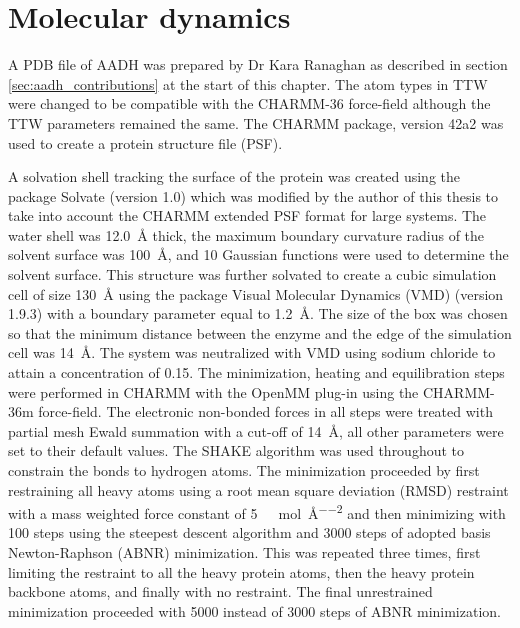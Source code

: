 \section{Molecular dynamics}\label{sec:aadh_md}

A PDB file of AADH was prepared by Dr Kara Ranaghan as described in section \ref{sec:aadh_contributions} at the start of this chapter. The atom types in TTW were changed to be compatible with the CHARMM-36 \cite{huangCHARMM36AllatomAdditive2013} force-field although the TTW parameters remained the same. The CHARMM package, version 42a2 \cite{brooksCHARMMBiomolecularSimulation2009} was used to create a protein structure file (PSF). 

A solvation shell tracking the surface of the protein was created using the package Solvate (version 1.0) \cite{grubmullerSolvate} which was modified by the author of this thesis to take into account the CHARMM extended PSF format for large systems. The water shell was \SI{12.0}{\angstrom} thick, the maximum boundary curvature radius of the solvent surface was \SI{100}{\angstrom}, and \num{10} Gaussian functions were used to determine the solvent surface. This structure was further solvated to create a cubic simulation cell of size \SI{130}{\angstrom} using the package Visual Molecular Dynamics (VMD) (version 1.9.3) \cite{HUMP96} with a boundary parameter equal to \SI{1.2}{\angstrom}. The size of the box was chosen so that the minimum distance between the enzyme and the edge of the simulation cell was  \SI{14}{\angstrom}. The system was neutralized with VMD using sodium chloride to attain a concentration of \SI{0.15}{\molar}. 
The minimization, heating and equilibration steps were performed in CHARMM with the OpenMM \cite{eastmanOpenMMRapidDevelopment2017} plug-in using the CHARMM-36m \cite{huangCHARMM36AllatomAdditive2013} force-field. The electronic non-bonded forces in all steps were treated with partial mesh Ewald summation \cite{dardenParticleMeshEwald1993} with a cut-off of \SI{14}{\angstrom}, all other parameters were set to their default values. The SHAKE \cite{ryckaertNumericalIntegrationCartesian1977b} algorithm was used throughout to constrain the bonds to hydrogen atoms. The minimization proceeded by first restraining all heavy atoms  using a root mean square deviation (RMSD) restraint with a mass weighted force constant of \SI{5}{\kilo\cal\per\mol\per\square\angstrom} and then minimizing with \num{100} steps using the steepest descent algorithm and \num{3000} steps of adopted basis Newton-Raphson (ABNR) minimization. This was repeated three times, first limiting the  restraint to all the heavy protein atoms, then the heavy protein backbone atoms, and finally with no restraint. The final unrestrained minimization proceeded with \num{5000} instead of \num{3000} steps of ABNR minimization. 

